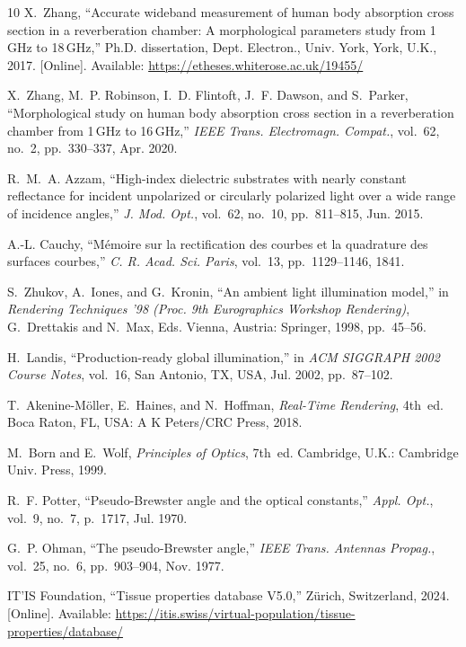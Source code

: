 \documentclass[journal,twocolumn,10pt]{IEEEtran}
\theoremstyle{plain}
\begin{document}
\begin{thebibliography}{10}
X.~Zhang, ``Accurate wideband measurement of human body absorption cross
  section in a reverberation chamber: A morphological parameters study
  from 1\,GHz to 18\,GHz,'' Ph.D. dissertation, Dept. Electron., Univ.
  York, York, U.K., 2017. [Online]. Available:
  \url{https://etheses.whiterose.ac.uk/19455/}

X.~Zhang, M.~P. Robinson, I.~D. Flintoft, J.~F. Dawson, and S.~Parker,
  ``Morphological study on human body absorption cross section in a
  reverberation chamber from 1\,GHz to 16\,GHz,'' \emph{IEEE Trans.
  Electromagn. Compat.}, vol.~62, no.~2, pp.~330--337, Apr. 2020.

R.~M.~A. Azzam, ``High-index dielectric substrates with nearly constant
  reflectance for incident unpolarized or circularly polarized light over
  a wide range of incidence angles,'' \emph{J. Mod. Opt.}, vol.~62,
  no.~10, pp.~811--815, Jun. 2015.

A.-L. Cauchy, ``M\'emoire sur la rectification des courbes et la
  quadrature des surfaces courbes,'' \emph{C. R. Acad. Sci. Paris},
  vol.~13, pp.~1129--1146, 1841.

S.~Zhukov, A.~Iones, and G.~Kronin, ``An ambient light illumination
  model,'' in \emph{Rendering Techniques '98 (Proc. 9th Eurographics
  Workshop Rendering)}, G.~Drettakis and N.~Max, Eds.
  Vienna, Austria: Springer, 1998, pp.~45--56.

H.~Landis, ``Production-ready global illumination,'' in \emph{ACM
  SIGGRAPH 2002 Course Notes}, vol.~16, San Antonio, TX, USA, Jul. 2002,
  pp.~87--102.

T.~Akenine-M{\"o}ller, E.~Haines, and N.~Hoffman, \emph{Real-Time
  Rendering}, 4th~ed. Boca Raton, FL, USA: A K Peters/CRC Press,
  2018.

M.~Born and E.~Wolf, \emph{Principles of Optics}, 7th~ed.
  Cambridge, U.K.: Cambridge Univ. Press, 1999.

R.~F. Potter, ``Pseudo-Brewster angle and the optical constants,''
  \emph{Appl. Opt.}, vol.~9, no.~7, p.~1717, Jul. 1970.

G.~P. Ohman, ``The pseudo-Brewster angle,'' \emph{IEEE Trans. Antennas
  Propag.}, vol.~25, no.~6, pp.~903--904, Nov. 1977.

IT'IS Foundation, ``Tissue properties database V5.0,'' Z\"urich,
  Switzerland, 2024. [Online]. Available:
  \url{https://itis.swiss/virtual-population/tissue-properties/database/}


\end{thebibliography}
\end{document}
